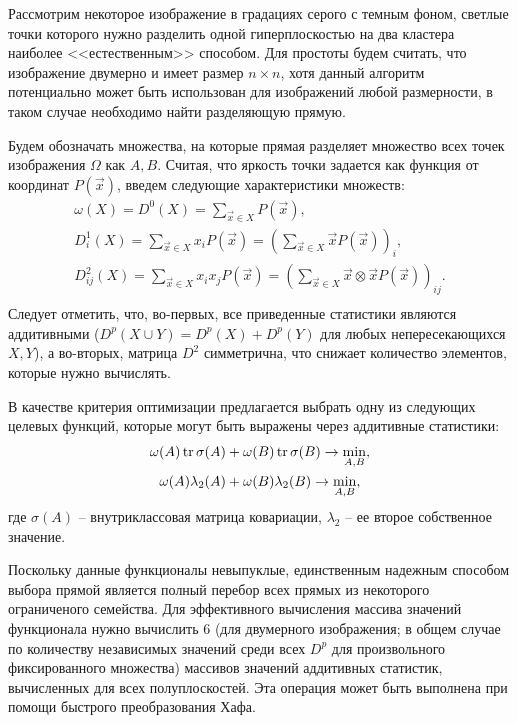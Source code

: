 
Рассмотрим некоторое изображение в градациях серого с темным фоном, светлые точки которого нужно разделить одной гиперплоскостью на два кластера наиболее <<естественным>> способом. Для простоты будем считать, что изображение двумерно и имеет размер $n \times n$, хотя данный алгоритм потенциально может быть использован для изображений любой размерности, в таком случае необходимо найти разделяющую прямую.

Будем обозначать множества, на которые прямая разделяет множество всех точек изображения $\Omega$ как $A, B$. Считая, что яркость точки задается как функция от координат $P\left( \vec x \right)$, введем следующие характеристики множеств:
\begin{gather*}
    \omega(X) = D^0(X) = \sum_{\vec x \in X} P\left( \vec x \right), \\
    D^1_i(X) = \sum_{\vec x \in X} x_i P\left( \vec x \right) = \left( \sum_{\vec x \in X} \vec x P\left( \vec x \right) \right)_i, \\
    D^2_{ij}(X) = \sum_{\vec x \in X} x_i x_j P\left( \vec x \right) = \left( \sum_{\vec x \in X} \vec x \otimes \vec x P\left( \vec x \right) \right)_{ij}. \\
\end{gather*}
Следует отметить, что, во-первых, все приведенные статистики являются аддитивными ($D^p\left( X \cup Y \right) = D^p(X) + D^p(Y)$ для любых непересекающихся $X, Y$), а во-вторых, матрица $D^2$ симметрична, что снижает количество элементов, которые нужно вычислять.

В качестве критерия оптимизации предлагается выбрать одну из следующих целевых функций, которые могут быть выражены через аддитивные статистики:
\begin{gather*}
    \omega(A) \operatorname{tr}\sigma(A) + \omega(B) \operatorname{tr}\sigma(B) \to \min_{A, B},\\
    \omega(A) \lambda_2(A) + \omega(B) \lambda_2(B) \to \min_{A, B},\\
\end{gather*}
где $\sigma(A)$ -- внутриклассовая матрица ковариации, $\lambda_2$ -- ее второе собственное значение.

Поскольку данные функционалы невыпуклые, единственным надежным способом выбора прямой является полный перебор всех прямых из некоторого ограниченого семейства. Для эффективного вычисления массива значений функционала нужно вычислить 6 (для двумерного изображения; в общем случае по количеству независимых значений среди всех $D^p$ для произвольного фиксированного множества) массивов значений аддитивных статистик, вычисленных для всех полуплоскостей. Эта операция может быть выполнена при помощи быстрого преобразования Хафа.

